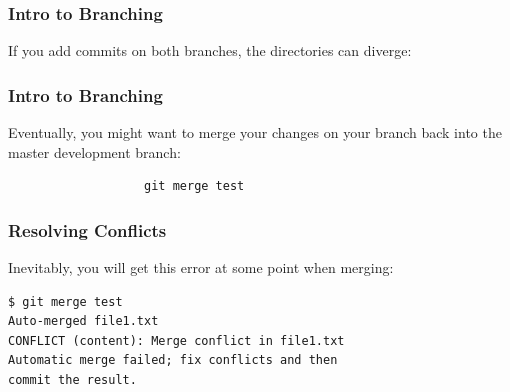 \documentclass{beamer}
\begin{document}
\begin{frame}
\frametitle{Intro to Branching}
If you add commits on both branches, the directories can diverge:
\begin{center}

\end{center}
\end{frame}

\begin{frame}[fragile]
\frametitle{Intro to Branching}
Eventually, you might want to merge your changes on your branch back into the master development branch:
\begin{center}
\begin{verbatim}
                   git merge test
\end{verbatim}
\end{center}
\end{frame}

\begin{frame}[fragile]
\frametitle{Resolving Conflicts}
Inevitably, you will get this error at some point when merging:
\begin{verbatim}
$ git merge test
Auto-merged file1.txt
CONFLICT (content): Merge conflict in file1.txt
Automatic merge failed; fix conflicts and then 
commit the result.
\end{verbatim}
\end{frame}
\end{document}
